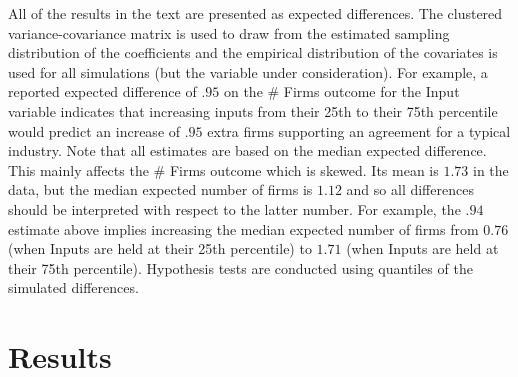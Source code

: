 \documentclass[hidelinks,12pt,letter]{article}
\begin{document}
All of the results in the text are presented as expected differences. The clustered variance-covariance matrix is used to draw from the estimated sampling distribution of the coefficients and the empirical distribution of the covariates is used for all simulations (but the variable under consideration). For example, a  reported expected difference of $.95$ on the \# Firms outcome for the Input variable indicates that increasing inputs from their 25th to their 75th percentile would predict an increase of $.95$ extra firms supporting an agreement for a typical industry. %
Note that all estimates are based on the median expected difference. This mainly affects the \# Firms outcome which is skewed. Its mean is $1.73$ in the data, but the median expected number of firms is $1.12$ and so all differences should be interpreted with respect to the latter number. For example, the $.94$ estimate above implies increasing the median expected number of firms from $0.76$ (when Inputs are held at their 25th percentile) to $1.71$ (when Inputs are held at their 75th percentile). Hypothesis tests are conducted using quantiles of the simulated differences.
 
\section*{Results}
\end{document}
